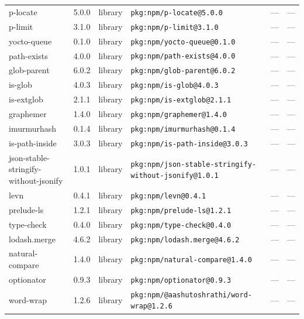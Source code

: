 \documentclass[11pt,a4paper]{article}
\begin{document}
\begin{longtable}{|p{4cm}|p{2cm}|p{1.6cm}|p{5cm}|p{1.5cm}|p{3.5cm}|}
\raggedright p-locate & 5.0.0 & library & \small\texttt{pkg:npm/p-locate@5.0.0} & — & \small — \\
\raggedright p-limit & 3.1.0 & library & \small\texttt{pkg:npm/p-limit@3.1.0} & — & \small — \\
\raggedright yocto-queue & 0.1.0 & library & \small\texttt{pkg:npm/yocto-queue@0.1.0} & — & \small — \\
\raggedright path-exists & 4.0.0 & library & \small\texttt{pkg:npm/path-exists@4.0.0} & — & \small — \\
\raggedright glob-parent & 6.0.2 & library & \small\texttt{pkg:npm/glob-parent@6.0.2} & — & \small — \\
\raggedright is-glob & 4.0.3 & library & \small\texttt{pkg:npm/is-glob@4.0.3} & — & \small — \\
\raggedright is-extglob & 2.1.1 & library & \small\texttt{pkg:npm/is-extglob@2.1.1} & — & \small — \\
\raggedright graphemer & 1.4.0 & library & \small\texttt{pkg:npm/graphemer@1.4.0} & — & \small — \\
\raggedright imurmurhash & 0.1.4 & library & \small\texttt{pkg:npm/imurmurhash@0.1.4} & — & \small — \\
\raggedright is-path-inside & 3.0.3 & library & \small\texttt{pkg:npm/is-path-inside@3.0.3} & — & \small — \\
\raggedright json-stable-stringify-without-jsonify & 1.0.1 & library & \small\texttt{pkg:npm/json-stable-stringify-without-jsonify@1.0.1} & — & \small — \\
\raggedright levn & 0.4.1 & library & \small\texttt{pkg:npm/levn@0.4.1} & — & \small — \\
\raggedright prelude-ls & 1.2.1 & library & \small\texttt{pkg:npm/prelude-ls@1.2.1} & — & \small — \\
\raggedright type-check & 0.4.0 & library & \small\texttt{pkg:npm/type-check@0.4.0} & — & \small — \\
\raggedright lodash.merge & 4.6.2 & library & \small\texttt{pkg:npm/lodash.merge@4.6.2} & — & \small — \\
\raggedright natural-compare & 1.4.0 & library & \small\texttt{pkg:npm/natural-compare@1.4.0} & — & \small — \\
\raggedright optionator & 0.9.3 & library & \small\texttt{pkg:npm/optionator@0.9.3} & — & \small — \\
\raggedright word-wrap & 1.2.6 & library & \small\texttt{pkg:npm/@aashutoshrathi/word-wrap@1.2.6} & — & \small — \\

\end{longtable}
\end{document}
